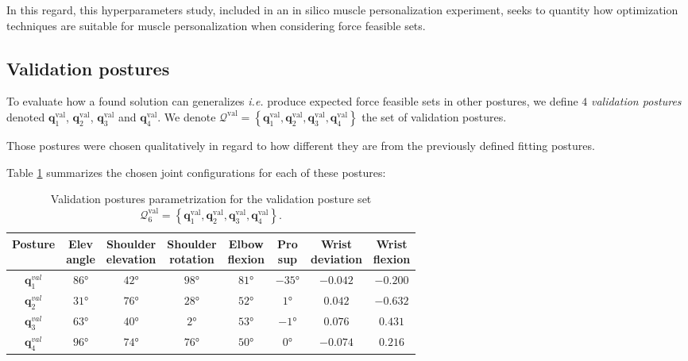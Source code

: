 In this regard, this hyperparameters study, included in an in silico muscle personalization experiment, seeks to quantity how optimization techniques are suitable for muscle personalization when considering force feasible sets.

\subsection{Validation postures} 
To evaluate how a found solution can generalizes \emph{i.e.} produce expected force feasible sets in other postures, we define $4$ \emph{validation postures} denoted $\mathbf{q}_1^{\text{val}}$, $\mathbf{q}_2^{\text{val}}$, $\mathbf{q}_3^{\text{val}}$ and $\mathbf{q}_4^{\text{val}}$. We denote $\mathcal{Q}^{\text{val}} = \left\{\mathbf{q}_1^{\text{val}}, \mathbf{q}_2^{\text{val}}, \mathbf{q}_3^{\text{val}}, \mathbf{q}_4^{\text{val}}\right\}$ the set of validation postures.

Those postures were chosen qualitatively in regard to how different they are from the previously defined fitting postures.

Table \ref{tab:postures_val_value} summarizes the chosen joint configurations for each of these postures:

\begin{table}[!ht]
    \centering
    \begin{tabular}{|c||c|c|c|c|c|c|c|}
    \hline
    \textbf{Posture} & \makecell{\textbf{Elev} \\ \textbf{angle}} & \makecell{\textbf{Shoulder} \\ \textbf{elevation}} & \makecell{\textbf{Shoulder} \\ \textbf{rotation}} & \makecell{\textbf{Elbow} \\ \textbf{flexion}} & \makecell{\textbf{Pro} \\ \textbf{sup}} & \makecell{\textbf{Wrist} \\ \textbf{deviation}} & \makecell{\textbf{Wrist} \\ \textbf{flexion}} \\
    \hline
    $\mathbf{q}_1^{val}$ & $86$° & $42$° & $98$° & $81$° & $-35$° & $-0.042$ & $-0.200$ \\
    $\mathbf{q}_2^{val}$ & $31$° & $76$° & $28$° & $52$° & $1$° & $0.042$ & $-0.632$ \\
    $\mathbf{q}_3^{val}$ & $63$° & $40$° & $2$° & $53$° & $-1$° & $0.076$ & $0.431$ \\
    $\mathbf{q}_4^{val}$ & $96$° & $74$° & $76$° & $50$° & $0$° & $-0.074$ & $0.216$ \\
    \hline
    \end{tabular}
    \caption{Validation postures parametrization for the validation posture set $\mathcal{Q}_6^{\text{val}} = \left\{\mathbf{q}_1^{\text{val}}, \mathbf{q}_2^{\text{val}}, \mathbf{q}_3^{\text{val}}, \mathbf{q}_4^{\text{val}}\right\}$.}
    \label{tab:postures_val_value}
\end{table}

